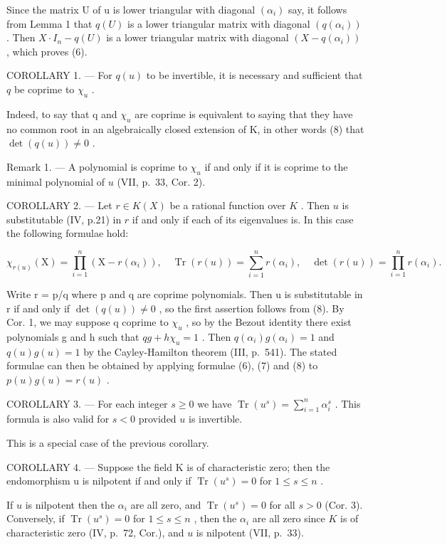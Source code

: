 Since the matrix U of u is lower triangular with diagonal \((\alpha_{i})\) say, it follows from Lemma 1 that \(q(U)\) is a lower triangular matrix with diagonal \((q(\alpha_{i}))\) . Then \(X \cdot I_{n} - q(U)\) is a lower triangular matrix with diagonal \((X - q(\alpha_{i}))\) , which proves (6).

COROLLARY 1. --- For \(q(u)\) to be invertible, it is necessary and sufficient that \(q\) be coprime to \(\chi_u\) .

Indeed, to say that q and \(\chi_{u}\) are coprime is equivalent to saying that they have no common root in an algebraically closed extension of K, in other words (8) that \(\det(q(u)) \neq 0\) .

Remark 1. --- A polynomial is coprime to \(\chi_{u}\) if and only if it is coprime to the minimal polynomial of \(u\) (VII, p.~33, Cor. 2).

COROLLARY 2. --- Let \(r \in K(X)\) be a rational function over \(K\) . Then \(u\) is substitutable (IV, p.21) in \(r\) if and only if each of its eigenvalues is. In this case the following formulae hold:

\[
\chi_ {r (u)} (\mathrm{X}) = \prod_ {i = 1} ^ {n} \left(\mathrm{X} - r \left(\alpha_ {i}\right)\right), \quad \operatorname{Tr} (r (u)) = \sum_ {i = 1} ^ {n} r \left(\alpha_ {i}\right), \quad \det (r (u)) = \prod_ {i = 1} ^ {n} r \left(\alpha_ {i}\right).
\]

Write r = p/q where p and q are coprime polynomials. Then u is substitutable in r if and only if \(\det(q(u)) \neq 0\) , so the first assertion follows from (8). By Cor. 1, we may suppose q coprime to \(\chi_{u}\) , so by the Bezout identity there exist polynomials g and h such that \(qg + h\chi_{u} = 1\) . Then \(q(\alpha_{i})g(\alpha_{i}) = 1\) and \(q(u)g(u) = 1\) by the Cayley-Hamilton theorem (III, p.~541). The stated formulae can then be obtained by applying formulae (6), (7) and (8) to \(p(u)g(u) = r(u)\) .

COROLLARY 3. --- For each integer \(s \geqslant 0\) we have \(\operatorname{Tr}(u^s) = \sum_{i=1}^{n} \alpha_i^s\) . This formula is also valid for \(s < 0\) provided \(u\) is invertible.

This is a special case of the previous corollary.

COROLLARY 4. --- Suppose the field K is of characteristic zero; then the endomorphism u is nilpotent if and only if \(\operatorname{Tr}(u^{s}) = 0\) for \(1 \leqslant s \leqslant n\) .

If \(u\) is nilpotent then the \(\alpha_{i}\) are all zero, and \(\operatorname{Tr}(u^{s}) = 0\) for all \(s > 0\) (Cor. 3). Conversely, if \(\operatorname{Tr}(u^{s}) = 0\) for \(1 \leqslant s \leqslant n\) , then the \(\alpha_{i}\) are all zero since \(K\) is of characteristic zero (IV, p.~72, Cor.), and \(u\) is nilpotent (VII, p.~33).

